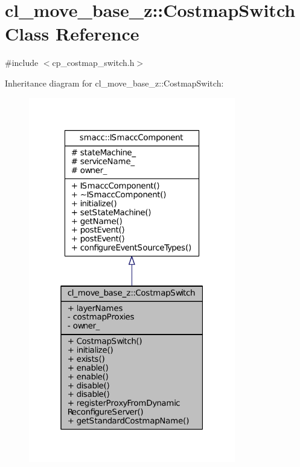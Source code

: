 \hypertarget{classcl__move__base__z_1_1CostmapSwitch}{}\section{cl\+\_\+move\+\_\+base\+\_\+z\+:\+:Costmap\+Switch Class Reference}
\label{classcl__move__base__z_1_1CostmapSwitch}


{\ttfamily \#include $<$cp\+\_\+costmap\+\_\+switch.\+h$>$}



Inheritance diagram for cl\+\_\+move\+\_\+base\+\_\+z\+:\+:Costmap\+Switch\+:
\nopagebreak
\begin{figure}[H]
\begin{center}
\leavevmode
\includegraphics[width=256pt]{classcl__move__base__z_1_1CostmapSwitch__inherit__graph}
\end{center}
\end{figure}


